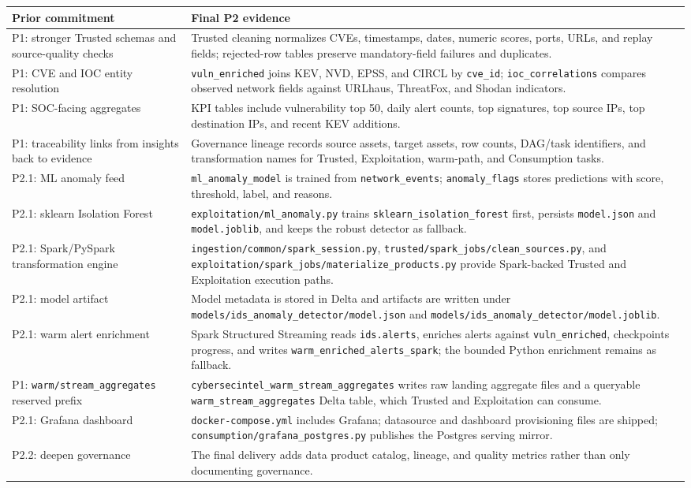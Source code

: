 \documentclass[11pt,a4paper]{article}
\newcommand{\code}[1]{\nolinkurl{#1}}
\newcommand{\hdr}{\rowcolor{csiHead}}
\begin{document}
\begin{tabularx}{\textwidth}{>{\raggedright\arraybackslash}p{3.4cm}X}
\toprule
\hdr
\textbf{Prior commitment} & \textbf{Final P2 evidence}\\
\midrule
P1: stronger Trusted schemas and source-quality checks & Trusted cleaning normalizes CVEs, timestamps, dates, numeric scores, ports, URLs, and replay fields; rejected-row tables preserve mandatory-field failures and duplicates.\\
P1: CVE and IOC entity resolution & \code{vuln_enriched} joins KEV, NVD, EPSS, and CIRCL by \code{cve_id}; \code{ioc_correlations} compares observed network fields against URLhaus, ThreatFox, and Shodan indicators.\\
P1: SOC-facing aggregates & KPI tables include vulnerability top 50, daily alert counts, top signatures, top source IPs, top destination IPs, and recent KEV additions.\\
P1: traceability links from insights back to evidence & Governance lineage records source assets, target assets, row counts, DAG/task identifiers, and transformation names for Trusted, Exploitation, warm-path, and Consumption tasks.\\
P2.1: ML anomaly feed & \code{ml_anomaly_model} is trained from \code{network_events}; \code{anomaly_flags} stores predictions with score, threshold, label, and reasons.\\
P2.1: sklearn Isolation Forest & \code{exploitation/ml_anomaly.py} trains \code{sklearn_isolation_forest} first, persists \code{model.json} and \code{model.joblib}, and keeps the robust detector as fallback.\\
P2.1: Spark/PySpark transformation engine & \code{ingestion/common/spark_session.py}, \code{trusted/spark_jobs/clean_sources.py}, and \code{exploitation/spark_jobs/materialize_products.py} provide Spark-backed Trusted and Exploitation execution paths.\\
P2.1: model artifact & Model metadata is stored in Delta and artifacts are written under \code{models/ids_anomaly_detector/model.json} and \code{models/ids_anomaly_detector/model.joblib}.\\
P2.1: warm alert enrichment & Spark Structured Streaming reads \code{ids.alerts}, enriches alerts against \code{vuln_enriched}, checkpoints progress, and writes \code{warm_enriched_alerts_spark}; the bounded Python enrichment remains as fallback.\\
P1: \code{warm/stream_aggregates} reserved prefix & \code{cybersecintel_warm_stream_aggregates} writes raw landing aggregate files and a queryable \code{warm_stream_aggregates} Delta table, which Trusted and Exploitation can consume.\\
P2.1: Grafana dashboard & \code{docker-compose.yml} includes Grafana; datasource and dashboard provisioning files are shipped; \code{consumption/grafana_postgres.py} publishes the Postgres serving mirror.\\
P2.2: deepen governance & The final delivery adds data product catalog, lineage, and quality metrics rather than only documenting governance.\\
\bottomrule
\end{tabularx}
\end{document}
